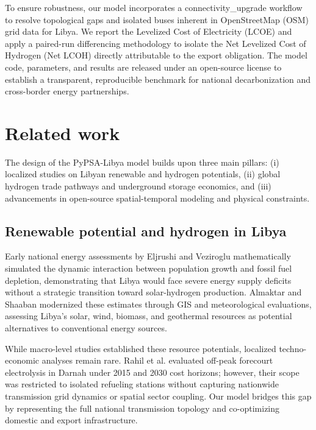 \documentclass[preprint,12pt]{elsarticle}
\begin{document}
To ensure robustness, our model incorporates a \textsf{connectivity\_upgrade} workflow to resolve topological gaps and isolated buses inherent in OpenStreetMap (OSM) grid data for Libya. We report the Levelized Cost of Electricity (LCOE) and apply a paired-run differencing methodology to isolate the Net Levelized Cost of Hydrogen (Net LCOH) directly attributable to the export obligation. The model code, parameters, and results are released under an open-source license to establish a transparent, reproducible benchmark for national decarbonization and cross-border energy partnerships.

\section{Related work}
\label{sec:related_work}

The design of the \textsf{PyPSA-Libya} model builds upon three main pillars: (i) localized studies on Libyan renewable and hydrogen potentials, (ii) global hydrogen trade pathways and underground storage economics, and (iii) advancements in open-source spatial-temporal modeling and physical constraints.

\subsection{Renewable potential and hydrogen in Libya}
Early national energy assessments by Eljrushi and Veziroglu \cite{eljrushi1990solar} mathematically simulated the dynamic interaction between population growth and fossil fuel depletion, demonstrating that Libya would face severe energy supply deficits without a strategic transition toward solar-hydrogen production. Almaktar and Shaaban \cite{almaktar2021prospects} modernized these estimates through GIS and meteorological evaluations, assessing Libya's solar, wind, biomass, and geothermal resources as potential alternatives to conventional energy sources.

While macro-level studies established these resource potentials, localized techno-economic analyses remain rare. Rahil et al. \cite{rahil2018techno} evaluated off-peak forecourt electrolysis in Darnah under 2015 and 2030 cost horizons; however, their scope was restricted to isolated refueling stations without capturing nationwide transmission grid dynamics or spatial sector coupling. Our model bridges this gap by representing the full national transmission topology and co-optimizing domestic and export infrastructure.
\end{document}
